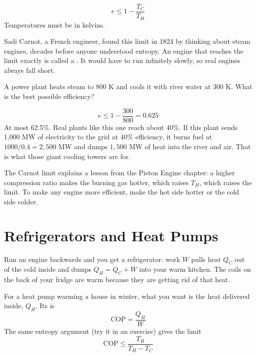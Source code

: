 \begin{mdframed}[style = important, frametitle = {The Carnot Limit}]
$$e \leq 1 - \frac{T_C}{T_H}$$
Temperatures must be in kelvins.
\end{mdframed}

Sadi Carnot, a French engineer, found this limit in 1824 by thinking about steam engines, decades
before anyone understood entropy. An engine that reaches the limit exactly is called a
. It would have to run infinitely slowly, so real engines always fall short.

\begin{Worked}
\begin{Problem}
A power plant heats steam to 800 K and cools it with river water at 300 K. What is
the best possible efficiency?
\end{Problem}
\begin{Solution}
$$e \leq 1 - \frac{300}{800} = 0.625$$
At most 62.5\%. Real plants like this one reach about 40\%. If this plant sends 1,000 MW of electricity
to the grid at 40\% efficiency, it burns fuel at $1000/0.4 = 2{,}500$ MW and dumps $1{,}500$ MW of heat
into the river and air. That is what those giant cooling towers are for.
\end{Solution}
\end{Worked}

The Carnot limit explains a lesson from the Piston Engine chapter: a higher compression ratio makes the burning
gas hotter, which raises $T_H$, which raises the limit. To make any engine more efficient, make the hot
side hotter or the cold side colder.

\section{Refrigerators and Heat Pumps}
Run an engine backwards and you get a refrigerator: work $W$ pulls heat $Q_C$ out of the cold inside and
dumps $Q_H = Q_C + W$ into your warm kitchen. The coils on the back of your fridge are warm because
they are getting rid of that heat.

For a heat pump warming a house in winter, what you want is the heat delivered inside, $Q_H$. Its
 is
$$\text{COP} = \frac{Q_H}{W}$$
The same entropy argument (try it in an exercise) gives the limit
$$\text{COP} \leq \frac{T_H}{T_H - T_C}$$

